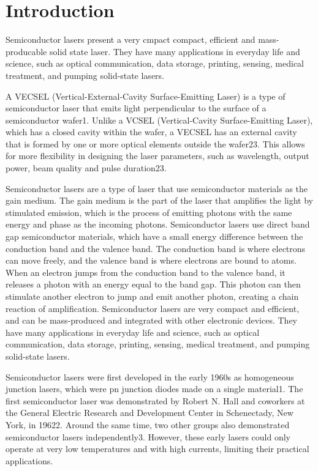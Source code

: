 \chapter{Introduction}\label{chapter:introduction}

Semiconductor lasers present a very cmpact compact, efficient and mass-producable solid state laser. They have many applications in everyday life and science, such as optical communication, data storage, printing, sensing, medical treatment, and pumping solid-state lasers.

A VECSEL (Vertical-External-Cavity Surface-Emitting Laser) is a type of semiconductor laser that emits light perpendicular to the surface of a semiconductor wafer1. Unlike a VCSEL (Vertical-Cavity Surface-Emitting Laser), which has a closed cavity within the wafer, a VECSEL has an external cavity that is formed by one or more optical elements outside the wafer23. This allows for more flexibility in designing the laser parameters, such as wavelength, output power, beam quality and pulse duration23.

Semiconductor lasers are a type of laser that use semiconductor materials as the gain medium. The gain medium is the part of the laser that amplifies the light by stimulated emission, which is the process of emitting photons with the same energy and phase as the incoming photons. Semiconductor lasers use direct band gap semiconductor materials, which have a small energy difference between the conduction band and the valence band. The conduction band is where electrons can move freely, and the valence band is where electrons are bound to atoms. When an electron jumps from the conduction band to the valence band, it releases a photon with an energy equal to the band gap. This photon can then stimulate another electron to jump and emit another photon, creating a chain reaction of amplification. Semiconductor lasers are very compact and efficient, and can be mass-produced and integrated with other electronic devices. They have many applications in everyday life and science, such as optical communication, data storage, printing, sensing, medical treatment, and pumping solid-state lasers.

Semiconductor lasers were first developed in the early 1960s as homogeneous junction lasers, which were pn junction diodes made on a single material1. The first semiconductor laser was demonstrated by Robert N. Hall and coworkers at the General Electric Research and Development Center in Schenectady, New York, in 19622. Around the same time, two other groups also demonstrated semiconductor lasers independently3. However, these early lasers could only operate at very low temperatures and with high currents, limiting their practical applications.

